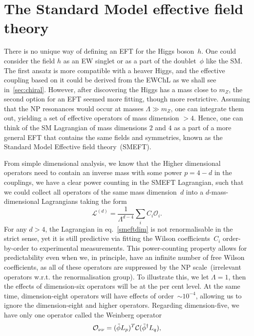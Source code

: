 \section{ The Standard Model effective field theory \label{sec:smeft}}
\par There is no unique way of defining an EFT for the Higgs boson~$h$. One could consider the field $h$ as an EW singlet or as a part of the doublet~$\phi$ like the SM. The first ansatz is more compatible with a heaver Higgs, and the effective coupling based on it could be derived from the EWChL as we shall see in~\autoref{sec:chiral}. However, after discovering the Higgs has a mass close to $m_Z$, the second option for an EFT seemed more fitting, though more restrictive. Assuming that the NP resonances would occur at masses $\Lambda \gg m_Z$, one can integrate them out, yielding a set of effective operators of mass dimension $> 4$.  Hence, one can think of the SM Lagrangian of mass dimensions $2$ and $4$ as a part of a more general EFT that contains the same fields and symmetries, known as the Standard Model Effective field theory~(SMEFT). 
\par From simple dimensional analysis, we know that the Higher dimensional operators need to contain an inverse mass with some power $p=4-d$ in the couplings, we have a clear power counting in the SMEFT Lagrangian, such that we could collect all operators of the same mass dimension~$d$ into a $d$-mass-dimensional Lagrangians taking the form
\begin{equation}
	\mathcal{L}^{(d)} = \frac{1}{\Lambda^{d-4}} \sum_i  C_i \mathcal{O}_i .
	\label{smeftdim}
\end{equation}
For any $d >4$, the Lagrangian in eq.~\eqref{smeftdim}  is not renormalisable in the strict sense, yet it is still predictive via fitting the Wilson coefficients~$C_i$ order-by-order to experimental measurements. This power-counting property allows for predictability even when we, in principle, have an infinite number of free Wilson coefficients, as all of these operators are suppressed by the NP scale~(irrelevant operators w.r.t. the renormalisation group). To illustrate this,  we let $\Lambda =1$, then the effects of dimension-six operators will be at the per cent level. At the same time, dimension-eight operators will have effects of order~$\sim10^{-4}$, allowing us to ignore the dimension-eight and higher operators.  Regarding dimension-five, we have only one operator called the Weinberg operator~\cite{PhysRevLett.43.1566}
\begin{equation}
	\mathcal{O}_{\nu \nu} =(\tilde{\phi} L_p)^T {\cal C} (\tilde{\phi}^{\dagger} L_q),
	\label{weinbergoperator}
\end{equation}
